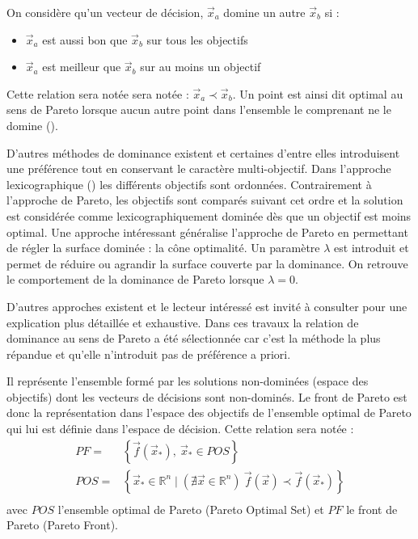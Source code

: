 \begin{Def}\label{def:dominance_de_pareto}
On considère qu’un vecteur de décision, $\vec{x}_{a}$ domine un autre $\vec{x}_{b}$ si :
\begin{itemize}
  \item $\vec{x}_{a}$ est aussi bon que $\vec{x}_{b}$ sur tous les objectifs
  \item $\vec{x}_{a}$ est meilleur que $\vec{x}_{b}$ sur au moins un objectif
\end{itemize}
Cette relation sera notée sera notée : $\vec{x}_{a} \prec \vec{x}_{b}$.
Un point est ainsi dit optimal au sens de Pareto lorsque aucun autre point dans
l’ensemble le comprenant ne le domine ().
\end{Def} 


D’autres méthodes de dominance existent et certaines d’entre elles introduisent
une préférence tout en conservant le caractère multi-objectif.
Dans l’approche lexicographique () les différents objectifs
sont ordonnées. Contrairement à l’approche de Pareto, les objectifs sont comparés
suivant cet ordre et la solution est considérée comme lexicographiquement dominée dès
que un objectif est moins optimal.
Une approche intéressant généralise l’approche de Pareto en permettant de régler
la surface dominée : la cône optimalité. Un paramètre $\lambda$ est introduit et
permet de réduire ou agrandir la surface couverte par la dominance. On retrouve le
comportement de la dominance de Pareto lorsque $\lambda = 0$.

D’autres approches existent et le lecteur intéressé est invité à consulter \cite{Collette2002}
pour une explication plus détaillée et exhaustive. Dans ces travaux la relation de
dominance au sens de Pareto a été sélectionnée car c’est la méthode la plus répandue
et qu’elle n’introduit pas de préférence a priori.

\begin{Def}\label{def:front_de_pareto}
Il représente l’ensemble formé par les solutions non-dominées (espace des objectifs)
dont les vecteurs de décisions sont non-dominés.
Le front de Pareto est donc la représentation dans l’espace des objectifs
de l’ensemble optimal de Pareto qui lui est définie dans l’espace de décision.
Cette relation sera notée :
\begin{equation}
  \begin{aligned}
    PF   =& \left\{ \vec{f}(\vec{x}_{*}), \  \vec{x}_{*} \in POS \right\} \\
    POS  =& \left\{ \vec{x}_{*} \in \mathbb{R}^{n} \mid (\nexists \vec{x} \in \mathbb{R}^{n}) \  \vec{f}(\vec{x}) \prec \vec{f}(\vec{x}_{*}) \right\} \\
  \end{aligned}
\end{equation}
avec $POS$ l’ensemble optimal de Pareto (Pareto Optimal Set) et $PF$ le front de Pareto
(Pareto Front).
\end{Def}


